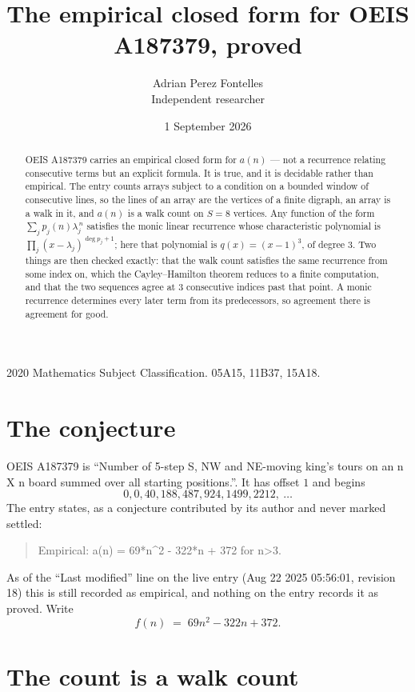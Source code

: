 \documentclass[11pt,a4paper]{article}
\title{The empirical closed form for OEIS A187379, proved}
\author{Adrian Perez Fontelles\\ \small Independent researcher}
\date{1 September 2026}
\theoremstyle{plain}
\theoremstyle{definition}
\begin{document}
\maketitle

\begin{abstract}
OEIS A187379 carries an empirical closed form for $a(n)$ --- not a recurrence relating
consecutive terms but an explicit formula. It is true, and it is decidable rather than
empirical. The entry counts arrays subject to a condition on a bounded window of consecutive lines, so the lines of an array are the
vertices of a finite digraph, an array is a walk in it, and $a(n)$ is a walk count on
$S=8$ vertices. Any function of the form $\sum_j p_j(n)\lambda_j^{\,n}$ satisfies the
monic linear recurrence whose characteristic polynomial is
$\prod_j(x-\lambda_j)^{\deg p_j+1}$; here that polynomial is $q(x)=(x-1)^{3}$, of degree
$3$. Two things are then checked exactly: that the walk count satisfies the same
recurrence from some index on, which the Cayley--Hamilton theorem reduces to a finite
computation, and that the two sequences agree at $3$ consecutive indices past that
point. A monic recurrence determines every later term from its predecessors, so agreement
there is agreement for good.
\end{abstract}

\noindent\small 2020 Mathematics Subject Classification. 05A15, 11B37, 15A18.\normalsize

\section{The conjecture}

OEIS A187379 is ``Number of 5-step S, NW and NE-moving king's tours on an n X n board summed over all starting positions.''. It has offset $1$ and begins
\[
0, 0, 40, 188, 487, 924, 1499, 2212,\ \dots
\]
The entry states, as a conjecture contributed by its author and never marked settled:
\begin{quote}
Empirical: a(n) = 69*n\^{}2 - 322*n + 372 for n>3.
\end{quote}
As of the ``Last modified'' line on the live entry (Aug 22 2025 05:56:01, revision 18) this is still
recorded as empirical, and nothing on the entry records it as proved. Write
\[
f(n)\;=\;69 n^{2} - 322 n + 372.
\]

\section{The count is a walk count}
\end{document}
